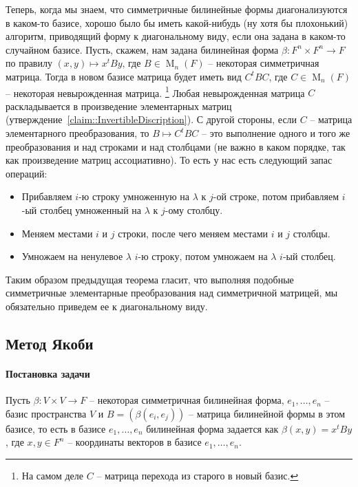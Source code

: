 Теперь, когда мы знаем, что симметричные билинейные формы диагонализуются в каком-то базисе, хорошо было бы иметь какой-нибудь (ну хотя бы плохонький) алгоритм, приводящий форму к диагональному виду, если она задана в каком-то случайном базисе.
Пусть, скажем, нам задана билинейная форма $\beta\colon F^n \times F^n\to F$ по правилу $(x,y)\mapsto x^t By$, где $B\in \operatorname{M}_n(F)$ -- некоторая симметричная матрица.
Тогда в  новом базисе матрица будет иметь вид $C^t B C$, где $C\in \operatorname{M}_n(F)$ -- некоторая невырожденная матрица.%
\footnote{На самом деле $C$ -- матрица перехода из старого в новый базис.}
Любая невырожденная матрица $C$ раскладывается в произведение элементарных матриц (утверждение~\ref{claim::InvertibleDiscription}).
С другой стороны, если $C$ -- матрица элементарного преобразования, то $B \mapsto C^tBC$ -- это выполнение одного и того же преобразования и над строками и над столбцами (не важно в каком порядке, так как произведение матриц ассоциативно).
То есть у нас есть следующий запас операций:
\begin{itemize}
\item Прибавляем $i$-ю строку умноженную на $\lambda$ к $j$-ой строке, потом прибавляем $i$-ый столбец умноженный на $\lambda$ к $j$-ому столбцу.

\item Меняем местами $i$ и $j$ строки, после чего меняем местами $i$ и $j$ столбцы.

\item Умножаем на ненулевое $\lambda$ $i$-ю строку, потом умножаем на $\lambda$ $i$-ый столбец.
\end{itemize}
Таким образом предыдущая теорема гласит, что выполняя подобные симметричные элементарные преобразования над симметричной матрицей, мы обязательно приведем ее к диагональному виду.


\subsection{Метод Якоби}
\label{subsection::Jacoby}

\paragraph{Постановка задачи}

Пусть $\beta\colon V\times V\to F$ -- некоторая симметричная билинейная форма, $e_1,\ldots,e_n$ -- базис пространства $V$ и $B = (\beta(e_i, e_j))$ -- матрица билинейной формы в этом базисе, то есть в базисе $e_1,\ldots,e_n$ билинейная форма задается как $\beta(x, y) = x^t B y$, где $x,y\in F^n$ -- координаты векторов в базисе $e_1,\ldots,e_n$.

